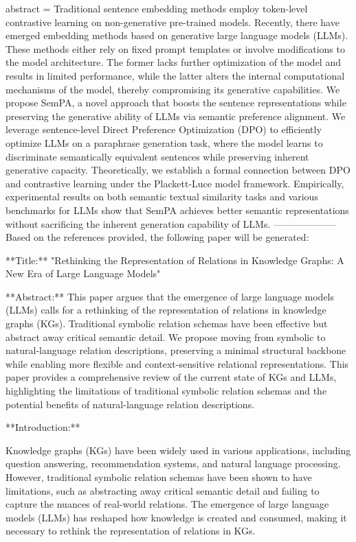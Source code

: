 {      abstract = {Traditional sentence embedding methods employ token-level contrastive learning on non-generative pre-trained models. Recently, there have emerged embedding methods based on generative large language models (LLMs). These methods either rely on fixed prompt templates or involve modifications to the model architecture. The former lacks further optimization of the model and results in limited performance, while the latter alters the internal computational mechanisms of the model, thereby compromising its generative capabilities. We propose SemPA, a novel approach that boosts the sentence representations while preserving the generative ability of LLMs via semantic preference alignment. We leverage sentence-level Direct Preference Optimization (DPO) to efficiently optimize LLMs on a paraphrase generation task, where the model learns to discriminate semantically equivalent sentences while preserving inherent generative capacity. Theoretically, we establish a formal connection between DPO and contrastive learning under the Plackett-Luce model framework. Empirically, experimental results on both semantic textual similarity tasks and various benchmarks for LLMs show that SemPA achieves better semantic representations without sacrificing the inherent generation capability of LLMs.}
}
        --------------------
         Based on the references provided, the following paper will be generated:

**Title:** "Rethinking the Representation of Relations in Knowledge Graphs: A New Era of Large Language Models"

**Abstract:** This paper argues that the emergence of large language models (LLMs) calls for a rethinking of the representation of relations in knowledge graphs (KGs). Traditional symbolic relation schemas have been effective but abstract away critical semantic detail. We propose moving from symbolic to natural-language relation descriptions, preserving a minimal structural backbone while enabling more flexible and context-sensitive relational representations. This paper provides a comprehensive review of the current state of KGs and LLMs, highlighting the limitations of traditional symbolic relation schemas and the potential benefits of natural-language relation descriptions.

**Introduction:**

Knowledge graphs (KGs) have been widely used in various applications, including question answering, recommendation systems, and natural language processing. However, traditional symbolic relation schemas have been shown to have limitations, such as abstracting away critical semantic detail and failing to capture the nuances of real-world relations. The emergence of large language models (LLMs) has reshaped how knowledge is created and consumed, making it necessary to rethink the representation of relations in KGs.


